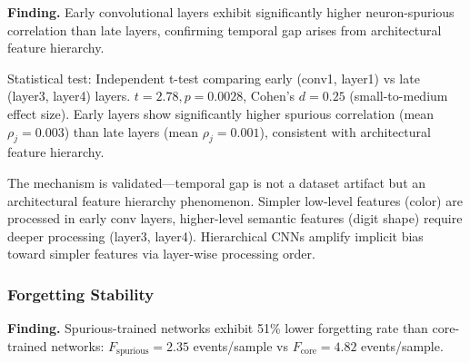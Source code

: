 \textbf{Finding.} Early convolutional layers exhibit significantly higher neuron-spurious correlation than late layers, confirming temporal gap arises from architectural feature hierarchy.

\begin{table}[htbp]
\centering
{}
\end{table}

Statistical test: Independent t-test comparing early (conv1, layer1) vs late (layer3, layer4) layers. $t = 2.78, p = 0.0028$, Cohen's $d = 0.25$ (small-to-medium effect size). Early layers show significantly higher spurious correlation (mean $\rho_j = 0.003$) than late layers (mean $\rho_j = 0.001$), consistent with architectural feature hierarchy.

The mechanism is validated---temporal gap is not a dataset artifact but an architectural feature hierarchy phenomenon. Simpler low-level features (color) are processed in early conv layers, higher-level semantic features (digit shape) require deeper processing (layer3, layer4). Hierarchical CNNs amplify implicit bias toward simpler features via layer-wise processing order.

\subsubsection{Forgetting Stability}

\textbf{Finding.} Spurious-trained networks exhibit 51\% lower forgetting rate than core-trained networks: $F_{\text{spurious}} = 2.35$ events/sample vs $F_{\text{core}} = 4.82$ events/sample.

\begin{table}[htbp]
\centering
{}
\end{table}

